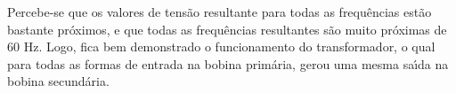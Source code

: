 Percebe-se que os valores de tens\~{a}o resultante para todas as frequ\^{e}ncias est\~{a}o bastante pr\'{o}ximos, e que todas as frequ\^{e}ncias resultantes s\~{a}o muito pr\'{o}ximas de 60 Hz. Logo, fica bem demonstrado o funcionamento do transformador, o qual para todas as formas de entrada na bobina prim\'{a}ria, gerou uma mesma sa\'{\i}da na bobina secund\'{a}ria. \\ 